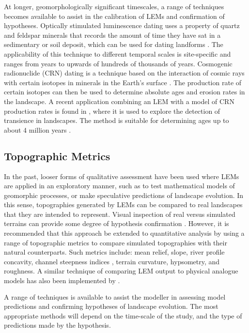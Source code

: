 At longer, geomorphologically significant timescales, a range of techniques becomes available to assist in the calibration of LEMs and confirmation of hypotheses. Optically stimulated luminescence dating uses a property of quartz and feldspar minerals that records the amount of time they have sat in a sedimentary or soil deposit, which can be used for dating landforms \citep{aitken1998introduction,Stokes1999a,Murray2000}. The applicability of this technique to different temporal scales is site-specific and ranges from years to upwards of hundreds of thousands of years. Cosmogenic radionuclide (CRN) dating is a technique based on the interaction of cosmic rays with certain isotopes in minerals in the Earth's surface \citep{Anderson1996,dunai2010cosmogenic}. The production rate of certain isotopes can then be used to determine absolute ages and erosion rates in the landscape. A recent application combining an LEM with a model of CRN production rates is found in \citep{mudd2017detection}, where it is used to explore the detection of transience in landscapes. The method is suitable for determining ages up to about 4 million years \citep{Burbank2011}.

\subsection{Topographic Metrics}
In the past, looser forms of qualitative assessment have been used where LEMs are applied in an exploratory manner, such as to test mathematical models of geomorphic processes, or make speculative predictions of landscape evolution. In this sense, topographies generated by LEMs can be compared to real landscapes that they are intended to represent. Visual inspection of real versus simulated terrains can provide some degree of hypothesis confirmation \citep{bras2003six,hooke2003predictive}. However, it is recommended that this approach be extended to quantitative analysis by using a range of topographic metrics to compare simulated topographies with their natural counterparts. Such metrics include: mean relief, slope, river profile concavity, channel steepness indices \citep[e.g.][]{wobus2006tectonics}, terrain curvature, hypsometry, and roughness. A similar technique of comparing LEM output to physical analogue models has also been implemented by \citet{hancock2002testing}. 

A range of techniques is available to assist the modeller in assessing model predictions and confirming hypotheses of landscape evolution. The most appropriate methods will depend on the time-scale of the study, and the type of predictions made by the hypothesis. 

